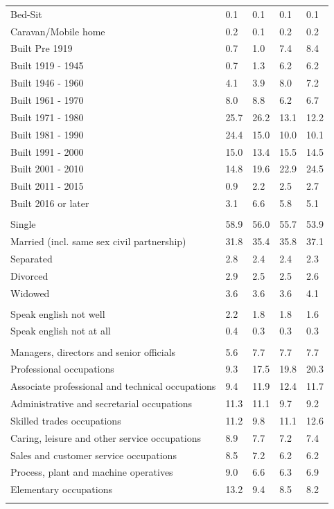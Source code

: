 \documentclass{article}
\begin{document}
\begin{table}[h]
\begin{tabular}{KTTTT}
Bed-Sit & 0.1& 0.1& 0.1& 0.1\\
Caravan/Mobile home & 0.2& 0.1& 0.2& 0.2\\
    \hline
Built Pre 1919 & 0.7& 1.0& 7.4& 8.4\\
Built 1919 - 1945 & 0.7& 1.3& 6.2& 6.2\\
Built  1946 - 1960 & 4.1& 3.9& 8.0& 7.2\\
Built  1961 - 1970 & 8.0& 8.8& 6.2& 6.7\\
Built  1971 - 1980 & 25.7& 26.2& 13.1& 12.2\\
Built  1981 - 1990 & 24.4& 15.0& 10.0& 10.1\\
Built  1991 - 2000 & 15.0& 13.4& 15.5& 14.5\\
Built  2001 - 2010 & 14.8& 19.6& 22.9& 24.5\\
Built  2011 - 2015 & 0.9& 2.2& 2.5& 2.7\\
Built  2016 or later & 3.1& 6.6& 5.8& 5.1\\
\hline
    \\
    \hline
Single & 58.9& 56.0& 55.7& 53.9\\
Married (incl. same sex civil partnership) & 31.8& 35.4& 35.8& 37.1\\
Separated  & 2.8& 2.4& 2.4& 2.3\\
Divorced  & 2.9& 2.5& 2.5& 2.6\\
Widowed & 3.6& 3.6& 3.6& 4.1\\
\hline
    \\ 
    \hline
Speak english not well & 2.2& 1.8& 1.8& 1.6\\
Speak english not at all & 0.4& 0.3& 0.3& 0.3\\
\hline
    \\
    \hline
Managers, directors and senior officials & 5.6& 7.7& 7.7& 7.7\\
Professional occupations &  9.3& 17.5& 19.8& 20.3\\
Associate professional and technical occupations &  9.4& 11.9& 12.4& 11.7\\
Administrative and secretarial occupations & 11.3& 11.1&  9.7&  9.2\\
Skilled trades occupations & 11.2&  9.8& 11.1& 12.6\\
Caring, leisure and other service occupations & 8.9& 7.7& 7.2& 7.4\\
Sales and customer service occupations & 8.5& 7.2& 6.2& 6.2\\
Process, plant and machine operatives & 9.0& 6.6& 6.3& 6.9\\
Elementary occupations & 13.2&  9.4&  8.5&  8.2\\
\hline
\end{tabular}
\end{table}
\end{document}
